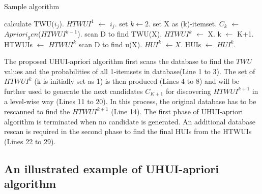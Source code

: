 \documentclass[conference]{IEEEtran}
\begin{document}
\begin{algorithm} %
\caption{Sample algorithm} %
\label{alg1} %
\begin{algorithmic}[1] %
\STATE calculate TWU($i_j$).
\ENDFOR
{}
\STATE  $HTWUI^1$ $\xleftarrow{}$ $i_j$.
\ENDIF
\ENDFOR
\STATE set $k \xleftarrow{} 2$.
\STATE set X as (k)-itemset.
\STATE $C_k$ $\xleftarrow{}$ $Apriori_gen$($HTWUI^{k-1}$).
\STATE scan D to find TWU(X).
\STATE $HTWUI^k$ $\xleftarrow{}$ X.
\ENDIF
\ENDFOR
\STATE k $\xleftarrow{}$ K+1.
\ENDWHILE
\STATE HTWUIs $\xleftarrow{}$ $HTWUI^k$
\STATE scan D to find u(X).
\STATE $HUI^k$ $\xleftarrow{} X$.
\ENDIF
\ENDFOR
\STATE HUIs $\xleftarrow{}$ $HUI^k$.

\end{algorithmic}
\end{algorithm}

The proposed UHUI-apriori algorithm first scans the database to find the $TWU$ values and the probabilities of all 1-itemsets in database(Line 1 to 3). The set of $HTWUI^k$ (k is initially set as 1) is then produced (Lines 4 to 8) and will be further used to generate the next candidates $C_{K+1}$ for discovering $HTWUI^{k+1}$ in a level-wise way (Lines 11 to 20). In this process, the original database has to be rescanned to find the $HTWUI^{k+1}$ (Line 14). The first phase of UHUI-apriori algorithm is terminated when no candidate is generated. An additional database rescan is required in the second phase to find the final HUIs from the HTWUIs (Lines 22 to 29).

\vspace{-0.1cm}
\subsection{An illustrated example of UHUI-apriori algorithm}
\end{document}
